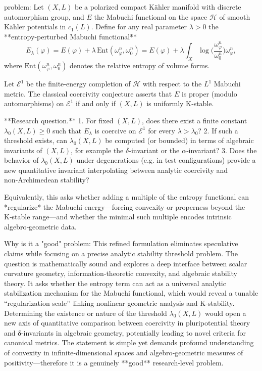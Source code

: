 problem:  
Let \((X,L)\) be a polarized compact Kähler manifold with discrete automorphism group, and \(E\) the Mabuchi functional on the space \(\mathcal{H}\) of smooth Kähler potentials in \(c_1(L)\).  Define for any real parameter \(\lambda>0\) the **entropy‑perturbed Mabuchi functional**
\[
E_{\lambda}(\varphi)=E(\varphi)+\lambda\,\mathrm{Ent}(\omega_{\varphi}^n,\omega_0^n)
=E(\varphi)+\lambda\!\int_X\!\log\!\Big(\frac{\omega_{\varphi}^n}{\omega_0^n}\Big)\omega_{\varphi}^n,
\]
where \(\mathrm{Ent}(\omega_{\varphi}^n,\omega_0^n)\) denotes the relative entropy of volume forms.

Let \(\mathcal{E}^1\) be the finite‑energy completion of \(\mathcal{H}\) with respect to the \(L^1\) Mabuchi metric.  The classical coercivity conjecture asserts that \(E\) is proper (modulo automorphisms) on \(\mathcal E^1\) if and only if \((X,L)\) is uniformly K‑stable.

**Research question.**
1. For fixed \((X,L)\), does there exist a finite constant \(\lambda_0(X,L)\ge0\) such that \(E_\lambda\) is coercive on \(\mathcal E^1\) for every \(\lambda>\lambda_0\)?
2. If such a threshold exists, can \(\lambda_0(X,L)\) be computed (or bounded) in terms of algebraic invariants of \((X,L)\), for example the \(\delta\)‑invariant or the \(\alpha\)‑invariant?
3. Does the behavior of \(\lambda_0(X,L)\) under degenerations (e.g. in test configurations) provide a new quantitative invariant interpolating between analytic coercivity and non‑Archimedean stability?

Equivalently, this asks whether adding a multiple of the entropy functional can *regularize* the Mabuchi energy—forcing convexity or properness beyond the K‑stable range—and whether the minimal such multiple encodes intrinsic algebro‑geometric data.

Why is it a "good" problem:  
This refined formulation eliminates speculative claims while focusing on a precise analytic stability threshold problem.  The question is mathematically sound and explores a deep interface between scalar curvature geometry, information‑theoretic convexity, and algebraic stability theory.  It asks whether the entropy term can act as a universal analytic stabilization mechanism for the Mabuchi functional, which would reveal a tunable “regularization scale’’ linking nonlinear geometric analysis and K‑stability.  Determining the existence or nature of the threshold \(\lambda_0(X,L)\) would open a new axis of quantitative comparison between coercivity in pluripotential theory and δ‑invariants in algebraic geometry, potentially leading to novel criteria for canonical metrics.  The statement is simple yet demands profound understanding of convexity in infinite‑dimensional spaces and algebro‑geometric measures of positivity—therefore it is a genuinely **good** research‑level problem.